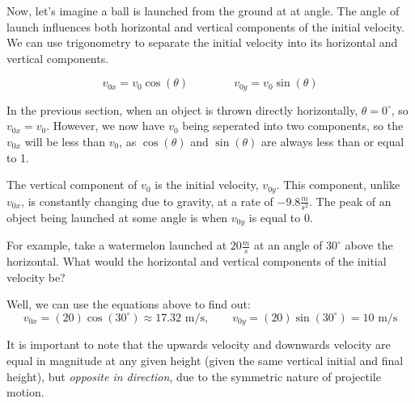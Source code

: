 Now, let's imagine a ball is launched from the ground at at angle. 
The angle of launch influences both horizontal and vertical components of the initial velocity. 
We can use trigonometry to separate the initial velocity into its horizontal and vertical components.

\[            
v_{0x} = v_0 \cos(\theta) \qquad \qquad
v_{0y} = v_0 \sin(\theta) 
\]

In the previous section, when an object is thrown directly horizontally, $\theta = 0 ^\circ$, so $v_{0x} = v_0$. However, we now have $v_{0}$ being seperated into two components, so the $v_{0x}$ will be less than $v_0$, as $\cos(\theta)$ and $\sin(\theta)$ are always less than or equal to 1.

The vertical component of $v_0$ is the initial velocity, $v_{0y}$. This component, unlike $v_{0x}$, is constantly changing due to gravity, at a rate of $-9.8 \frac{m}{s^2}$. The peak of an object being launched at some angle is when $v_{0y}$ is equal to 0. 


\begin{center}
\end{center}

For example, take a watermelon launched at $20 \frac{m}{s}$ at an angle of $30^\circ$ above the horizontal. What would the horizontal and vertical components of the initial velocity be?

Well, we can use the equations above to find out:
$$
v_{0x} = (20) \cos(30^\circ) \approx 17.32 \text{ m/s}, \qquad v_{0y} = (20) \sin(30^\circ) = 10 \text{ m/s}
$$

It is important to note that the upwards velocity and downwards velocity are equal in magnitude at any given height (given the same vertical initial and final height), but \emph{opposite in direction}, due to the symmetric nature of projectile motion.


